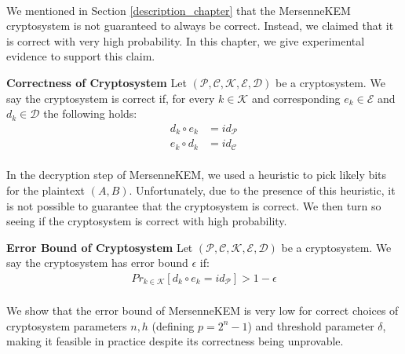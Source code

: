 \paragraph{}
We mentioned in Section \ref{description_chapter} that the MersenneKEM cryptosystem is not guaranteed to always be correct. Instead, we claimed that it is correct with very high probability. In this chapter, we give experimental evidence to support this claim.

\theoremstyle{definition}
\begin{definition}{\textbf{Correctness of Cryptosystem}}
Let $(\mathcal{P}, \mathcal{C}, \mathcal{K}, \mathcal{E}, \mathcal{D})$ be a cryptosystem. We say the cryptosystem is correct if, for every $k \in \mathcal{K}$ and corresponding $e_k \in \mathcal{E}$ and $d_k \in \mathcal{D}$ the following holds:
\begin{align*}
    d_k \circ e_k &= id_\mathcal{P}\\
    e_k \circ d_k &= id_\mathcal{C}
\end{align*}
\end{definition}

\paragraph{}
In the decryption step of MersenneKEM, we used a heuristic to pick likely bits for the plaintext $(A, B)$. Unfortunately, due to the presence of this heuristic, it is not possible to guarantee that the cryptosystem is correct. We then turn so seeing if the cryptosystem is correct with high probability.

\theoremstyle{definition}
\begin{definition}{\textbf{Error Bound of Cryptosystem}}
Let $(\mathcal{P}, \mathcal{C}, \mathcal{K}, \mathcal{E}, \mathcal{D})$ be a cryptosystem. We say the cryptosystem has error bound $\epsilon$ if:
\begin{align*}
    Pr_{k \in \mathcal{K}} [d_k \circ e_k = id_\mathcal{P}] > 1 - \epsilon
\end{align*}
\end{definition}

\paragraph{}
We show that the error bound of MersenneKEM is very low for correct choices of cryptosystem parameters $n, h$ (defining $p = 2^n - 1$) and threshold parameter $\delta$, making it feasible in practice despite its correctness being unprovable.

